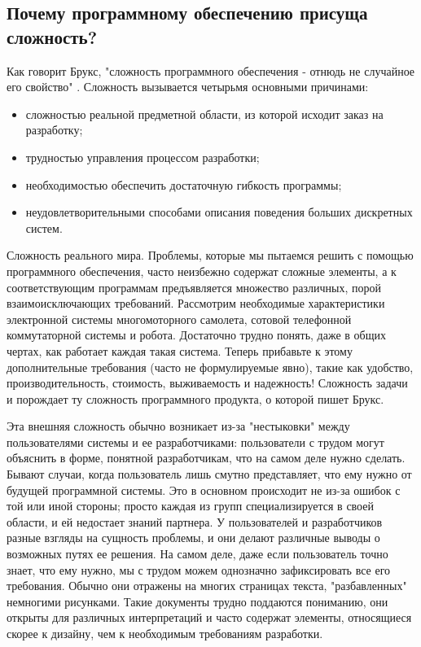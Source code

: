 \documentclass[11pt]{article}
\begin{document}
\subsection{Почему программному обеспечению присуща сложность?}
Как говорит Брукс, "сложность программного обеспечения - отнюдь не случайное его свойство" \cite[p.11]{3}. Сложность вызывается четырьмя основными причинами: 
\begin{itemize}
    \item сложностью реальной предметной области, из которой исходит заказ на разработку;
    \item трудностью управления процессом разработки;
    \item необходимостью обеспечить достаточную гибкость программы;
    \item неудовлетворительными способами описания поведения больших дискретных систем.
\end{itemize}
\par Сложность реального мира. Проблемы, которые мы пытаемся решить с помощью программного обеспечения, часто неизбежно содержат сложные элементы, а к соответствующим программам предъявляется множество различных, порой взаимоисключающих требований. Рассмотрим необходимые характеристики электронной системы многомоторного самолета, сотовой телефонной коммутаторной системы и робота. Достаточно трудно понять, даже в общих чертах, как работает каждая такая система. Теперь прибавьте к этому дополнительные требования (часто не формулируемые явно), такие как удобство, производительность, стоимость, выживаемость и надежность! Сложность задачи и порождает ту сложность программного продукта, о которой пишет Брукс. \par
Эта внешняя сложность обычно возникает из-за "нестыковки" между пользователями системы и ее разработчиками: пользователи с трудом могут объяснить в форме, понятной разработчикам, что на самом деле нужно сделать. Бывают случаи, когда пользователь лишь смутно представляет, что ему нужно от будущей программной системы. Это в основном происходит не из-за ошибок с той или иной стороны; просто каждая из групп специализируется в своей области, и ей недостает знаний партнера. У пользователей и разработчиков разные взгляды на сущность проблемы, и они делают различные выводы о возможных путях ее решения. На самом деле, даже если пользователь точно знает, что ему нужно, мы с трудом можем однозначно зафиксировать все его требования. Обычно они отражены на многих страницах текста, "разбавленных" немногими рисунками. Такие документы трудно поддаются пониманию, они открыты для различных интерпретаций и часто содержат элементы, относящиеся скорее к дизайну, чем к необходимым требованиям разработки.\par 
\end{document}

